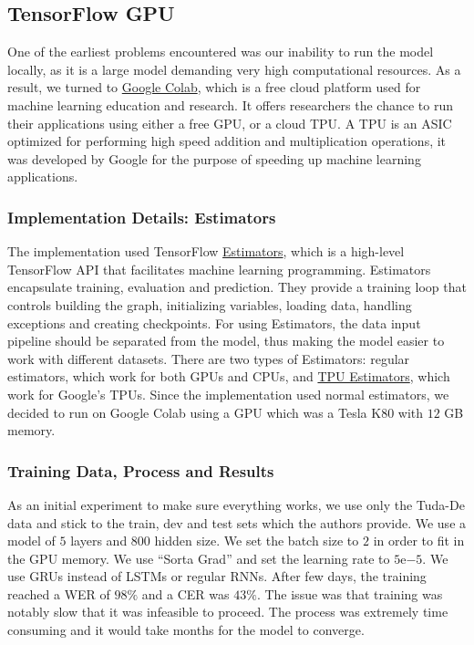 \subsection{TensorFlow GPU}
\label{meth:s3_sub1}

One of the earliest problems encountered was our inability to run the model locally, as it is a large model demanding very high computational resources. As a result, we turned to \href{https://colab.research.google.com/}{Google Colab}, which is a free cloud platform used for machine learning education and research. It offers researchers the chance to run their applications using either a free GPU, or a cloud \ac{TPU}. A \ac{TPU} is an \ac{ASIC} optimized for performing high speed addition and multiplication operations, it was developed by Google for the purpose of speeding up machine learning applications. 

\subsubsection{Implementation Details: Estimators}
\label{meth:s3_sub1_subsub1}

The implementation used TensorFlow \href{https://www.tensorflow.org/guide/estimators}{Estimators}, which is a high-level TensorFlow API that facilitates machine learning programming. Estimators encapsulate training, evaluation and prediction. They provide a training loop that controls building the graph, initializing variables, loading data, handling exceptions and creating checkpoints. For using Estimators, the data input pipeline should be separated from the model, thus making the model easier to work with different datasets. There are two types of Estimators: regular estimators, which work for both GPUs and CPUs, and \href{URL}{TPU Estimators}, which work for Google's \ac{TPU}s. Since the implementation used normal estimators, we decided to run on Google Colab using a GPU which was a Tesla K80 with $12$ GB memory.

\subsubsection{Training Data, Process and Results}
\label{meth:s3_sub1_subsub2}

As an initial experiment to make sure everything works, we use only the Tuda-De data and stick to the train, dev and test sets which the authors provide. We use a model of $5$ layers and $800$ hidden size. We set the batch size to $2$ in order to fit in the GPU memory. We use \enquote{Sorta Grad} and set the learning rate to $5\mathrm{e}{-5}$. We use \ac{GRU}s instead of \ac{LSTM}s or regular \ac{RNN}s. After few days, the training reached a \ac{WER} of $98\%$ and a \ac{CER} was $43\%$. The issue was that training was notably slow that it was infeasible to proceed. The process was extremely time consuming and it would take months for the model to converge. 

